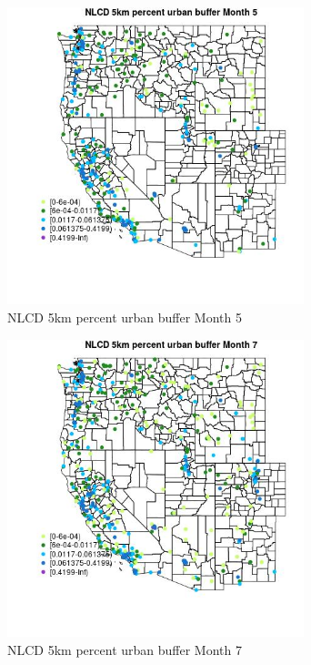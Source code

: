 \begin{figure} 
\centering  
\includegraphics[width=0.77\textwidth]{Code_Outputs/Report_ML_input_PM25_Step4_part_e_de_duplicated_aves_compiled_2019-05-18wNAs_MapObsMo5NLCD_5km_percent_urban_buffer.jpg} 
\caption{\label{fig:Report_ML_input_PM25_Step4_part_e_de_duplicated_aves_compiled_2019-05-18wNAsMapObsMo5NLCD_5km_percent_urban_buffer}NLCD 5km percent urban buffer Month 5} 
\end{figure} 
 

\clearpage 

\begin{figure} 
\centering  
\includegraphics[width=0.77\textwidth]{Code_Outputs/Report_ML_input_PM25_Step4_part_e_de_duplicated_aves_compiled_2019-05-18wNAs_MapObsMo7NLCD_5km_percent_urban_buffer.jpg} 
\caption{\label{fig:Report_ML_input_PM25_Step4_part_e_de_duplicated_aves_compiled_2019-05-18wNAsMapObsMo7NLCD_5km_percent_urban_buffer}NLCD 5km percent urban buffer Month 7} 
\end{figure} 
 

